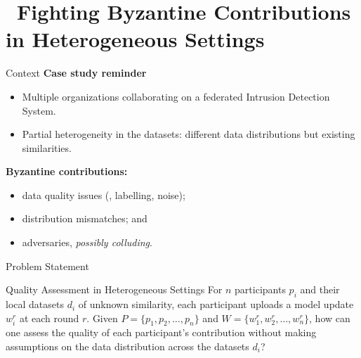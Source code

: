 
\setlength{\titleoffset}{-1.05cm}
\section
  [{\texttt{RADAR}~\circled[contrib/radar]{R}}]
  {~Fighting Byzantine Contributions in Heterogeneous Settings}


\begin{frame}[plain]
  \sectionpage

\end{frame}


\begin{frame}{Context}
  \textbf{Case study reminder}
  \begin{itemize}
    \item Multiple organizations collaborating on a federated Intrusion Detection System.
    \item Partial heterogeneity in the datasets: different data distributions but existing similarities.
  \end{itemize}

  \pause
  \textbf{Byzantine contributions:}
  \begin{itemize}
    \item data quality issues (\eg, labelling, noise);
    \item distribution mismatches; and
    \item adversaries, \textit{possibly colluding}.

  \end{itemize}

\end{frame}

\begin{frame}{Problem Statement}
  \begin{block}{Quality Assessment in Heterogeneous Settings}
    For $n$ participants $p_i$ and their local datasets $d_i$ of unknown similarity, each participant uploads a model update $w_i^r$ at each round $r$. Given $P = \{ p_1, p_2, \dots, p_n \} $ and $W = \{ w_1^r, w_2^r, \dots, w_n^r \} $, how can one assess the quality of each participant’s contribution without making assumptions on the data distribution across the datasets $d_i$?
  \end{block}
\end{frame}


